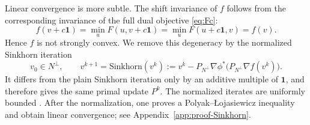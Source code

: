 \documentclass{article}
\theoremstyle{plain}
\newtheorem{lemma}{Lemma}
\theoremstyle{remark}
\newcommand{\LC}[1]{\textcolor{red}{#1}}
\begin{document}
Linear convergence is more subtle. The shift invariance of $f$ follows from the corresponding invariance of the full dual objective \eqref{eq:Fc}:
$$
f(v+c\mathbf{1})
=
\min_u F(u,v+c\mathbf{1})
=
\min_u F(u+c\mathbf{1},v)
=
f(v).
$$
Hence $f$ is not strongly convex. We remove this degeneracy by the normalized Sinkhorn iteration
\begin{equation}\label{eq:normalized-sinkhorn}
v_0\in N^\perp,\qquad
v^{k+1} = \text{Sinkhorn}(v^k):=
v^k-P_{N^\perp}\nabla\phi^*\!\bigl(P_{N^\perp}\nabla f(v^k)\bigr).
\end{equation}
It differs from the plain Sinkhorn iteration only by an additive multiple of $\mathbf{1}$, and therefore gives the same primal update $P^k$. The normalized iterates are uniformly bounded \citep{carlier2022linear}.  After the normalization, one proves a Polyak--{\L}ojasiewicz inequality and obtain linear convergence; see Appendix~\ref{app:proof-Sinkhorn}.




\end{document}
